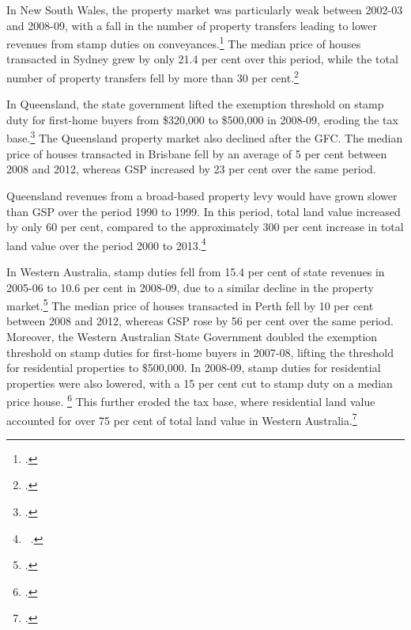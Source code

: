 \documentclass[twoside,english]{grattanBudgetRepairb5portrait}
\begin{document}
\begin{subappendices}
In New South Wales, the property market was particularly weak between 2002-03 and  2008-09, with a fall in the number of property transfers leading to lower revenues from stamp duties on conveyances.\footcite[][18]{CGC2009a}  The median price of houses transacted in Sydney grew by only 21.4 per cent over this period, while the total number of property transfers fell by more than 30 per cent.\footcite{ABS2015ResidentialPropertyIndex}  

In Queensland, the state government lifted the exemption threshold on stamp duty for first-home buyers from \$320,000 to \$500,000 in 2008-09, eroding the tax base.\footcite{TreasuryTradeQld2012}  The Queensland property market also declined after the GFC. The median price of houses transacted in Brisbane fell by an average of 5 per cent between 2008 and 2012, whereas GSP increased by 23 per cent over the same period.  

Queensland revenues from a broad-based property levy would have grown slower than GSP over the period 1990 to 1999. In this period, total land value increased by only 60 per cent, compared to the approximately 300 per cent increase in total land value over the period 2000 to 2013.\footnote{\gao\ \textcite{ABS2014e}.}

In Western Australia, stamp duties fell from 15.4 per cent of state revenues in 2005-06 to 10.6 per cent in 2008-09, due to a similar decline in the property market.\footcite[][13]{CGC2010b}   The median price of houses transacted in Perth fell by 10 per cent between 2008 and 2012, whereas GSP rose by 56 per cent over the same period. Moreover, the Western Australian State Government doubled the exemption threshold on stamp duties for first-home buyers in 2007-08, lifting the threshold for residential properties to \$500,000.  In 2008-09, stamp duties for residential properties were also lowered, with a 15 per cent cut to stamp duty on a median price house. \footcite{Treasury2007a}   This further eroded the tax base, where residential land value accounted for over 75 per cent of total land value in Western Australia.\footcite{Treasury2008a}

\cleardoubleevenstandardpage
\newcommand{\propPhantomNotes}{
{\color{white}
\notes{‘Property levy’ shows the revenues that would have been raised with a broad-based property levy of 0.2 per cent applied to unimproved land values had it been in place over the period.}

\source{\textcites{ABSmultipleyears}{ABS2014e}; Grattan analysis.}}
}


\end{subappendices}
\end{document}
